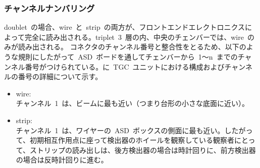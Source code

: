 \subsubsection{チャンネルナンバリング}
doublet~の場合、wire~と~strip~の両方が、フロントエンドエレクトロニクスによって完全に読み出される。triplet~3~層の内、中央のチェンバーでは、wire~のみが読み出される。
コネクタのチャンネル番号と整合性をとるため、以下のような規則にしたがって~ASD~ボードを通してチェンバーから~1～n~までのチャンネル番号がつけられている。に~TGC~ユニットにおける構成およびチャンネルの番号の詳細について示す。
\begin{itemize}
\item wire: \\
チャンネル~1~は、ビームに最も近い（つまり台形の小さな底面に近い）。
\item strip: \\
チャンネル~1~は、ワイヤーの~ASD~ボックスの側面に最も近い。したがって、初期相互作用点に座って検出器のホイールを観察している観察者にとって、ストリップの読み出しは、後方検出器の場合は時計回りに、前方検出器の場合は反時計回りに進む。
\end{itemize}

